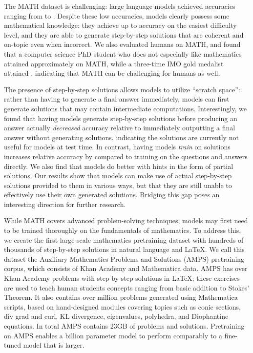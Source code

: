 \documentclass{article}
\begin{document}
The MATH dataset is challenging: large language models achieved 
accuracies ranging from  to . Despite these low accuracies, models clearly possess some 
mathematical knowledge: they achieve up to  accuracy on the easiest difficulty level, and they are able to generate step-by-step solutions that are coherent and on-topic even when incorrect. We also evaluated humans on MATH, and found that a computer science PhD student who does not especially like mathematics attained approximately  on MATH, while a three-time IMO gold medalist attained , indicating that MATH can be challenging for humans as well. 

The presence of step-by-step solutions allows models to utilize ``scratch space'': rather than having to generate 
a final answer immediately, models can first generate solutions that may contain intermediate computations. Interestingly, we found that having models generate step-by-step solutions before producing an answer actually \emph{decreased} accuracy relative to immediately outputting a final answer without generating solutions, indicating the solutions are currently not useful for models at test time. In contrast, having models \emph{train} on solutions increases relative accuracy by  compared to training on the questions and answers directly. We also find that models do better with hints in the form of partial solutions. Our results show that models can make use of actual step-by-step solutions provided to them in various ways, but that they are still unable to effectively use their own generated solutions. Bridging this gap poses an interesting direction for further research.






While MATH covers advanced problem-solving techniques, models 
may first need to be trained thoroughly on the fundamentals of 
mathematics. To address this, 
we create the first large-scale mathematics pretraining dataset with hundreds of thousands of step-by-step solutions in natural language and \LaTeX{}.
We call this dataset the Auxiliary Mathematics Problems and Solutions (AMPS) pretraining corpus, which consists of Khan Academy and Mathematica data. AMPS has over  Khan Academy problems with step-by-step solutions in \LaTeX{}; these exercises are used to teach human students concepts ranging from basic addition to Stokes' Theorem.
It also contains over  million problems generated using Mathematica scripts, based on  hand-designed modules covering topics such as conic sections, div grad and curl, KL divergence, eigenvalues, polyhedra, and Diophantine equations. In total AMPS contains 
23GB of problems and solutions.
Pretraining on AMPS enables a  billion parameter model to perform comparably to a fine-tuned model that is  larger.
\end{document}
